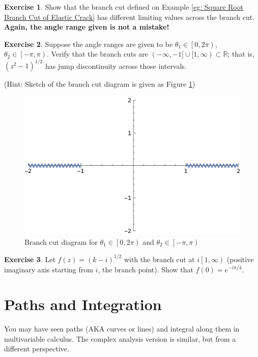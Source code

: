 \documentclass[a4paper, 12pt]{article}
\theoremstyle{definition}
\newtheorem{exercise}{Exercise}
\numberwithin{theorem}{section}
\numberwithin{definition}{section}
\numberwithin{exercise}{section}
\numberwithin{remark}{section}
\numberwithin{figure}{section}
\numberwithin{example}{section}
\newcommand{\R}{\mathbb{R}}
\begin{document}
\begin{exercise}
    Show that the branch cut defined on Example \ref{eg: Square Root Branch Cut of Elastic Crack}
    has different limiting values across the branch cut.
    \textbf{Again, the angle range given is not a mistake!}
\end{exercise}
\begin{exercise}
    Suppose the angle ranges are given to be $\theta_1 \in \left[ 0, 2\pi \right)$, $\theta_2 \in \left[ -\pi, \pi \right)$.
    Verify that the branch cuts are $(-\infty, -1] \cup [1, \infty) \subset \R$;
    that is, $\left( z^2 - 1 \right)^{1/2}$ has jump discontinuity across
    those intervals.

    (Hint: Sketch of the branch cut diagram is given as Figure \ref{fig: Crack Tip Out})
    \begin{figure}[tbp]
        \centering
        \includegraphics[scale=0.7]{crackTipOut}
        \caption{Branch cut diagram for $\theta_1 \in \left[ 0, 2\pi \right)$ and $\theta_2 \in \left[ -\pi, \pi \right)$}
        \label{fig: Crack Tip Out}
    \end{figure}
\end{exercise}
\begin{exercise}
    Let $f(z) = \left( k-i \right)^{1/2}$ with the branch cut at $i \left[ 1, \infty \right)$ (positive imaginary axis starting from $i$, the branch point).
    Show that $f(0) = e^{-i \pi/4}$.
\end{exercise}


\section{Paths and Integration}
You may have seen paths (AKA curves or lines) and integral along them
in multivariable calculus.
The complex analysis version is similar, but from a different perspective.
\end{document}
